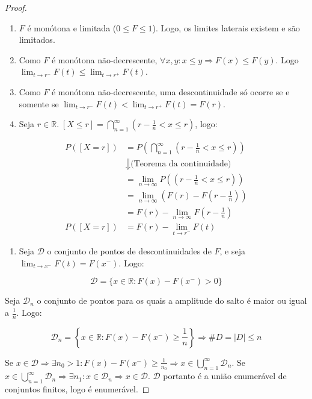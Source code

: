 \documentclass[
]{article}
\providecommand{\tightlist}{%
  \setlength{\itemsep}{0pt}\setlength{\parskip}{0pt}}
\theoremstyle{definition}
\theoremstyle{definition}
\theoremstyle{definition}
\theoremstyle{definition}
\theoremstyle{remark}
\begin{document}
\begin{proof}
\leavevmode

\begin{enumerate}
\def\labelenumi{\alph{enumi})}
\item
  \(F\) é monótona e limitada (\(0 \le F \le 1\)). Logo, os limites laterais existem e são limitados.
\item
  Como \(F\) é monótona não-decrescente, \(\forall x,y : x \le y \Rightarrow F(x) \le F(y)\). Logo \(\lim_{t \to r^{-}}F(t) \le \lim_{t \to r^{+}}F(t)\).
\item
  Como \(F\) é monótona não-decrescente, uma descontinuidade só ocorre se e somente se \(\lim_{t \to r^{-}}F(t) < \lim_{t \to r^{+}}F(t) = F(r)\).
\item
  Seja \(r \in \mathbb{R}. \; [X \le r] = \bigcap_{n=1}^{\infty}(r-\frac{1}{n} < x \le r)\), logo:
\end{enumerate}

\begin{align*}
P([X = r]) &= P\left(\bigcap_{n=1}^{\infty}\left(r-\frac{1}{n} < x \le r\right)\right) \\
&\Downarrow \text{(Teorema da continuidade)} \\
&=\lim_{n \to \infty}P\left(\left(r - \frac{1}{n} < x \le r\right)\right) \\
&= \lim_{n \to \infty} \left(F(r) - F\left(r - \frac{1}{n}\right)\right) \\
&= F(r) - \lim_{n \to \infty}F\left(r - \frac{1}{n}\right) \\
P([X = r]) &= F(r) - \lim_{t \to r^{-}}F(t)
\end{align*}

\begin{enumerate}
\def\labelenumi{\alph{enumi})}
\setcounter{enumi}{4}
\tightlist
\item
  Seja \(\mathcal{D}\) o conjunto de pontos de descontinuidades de \(F\), e seja \(\lim_{t \to x^{-}}F(t) = F(x^{-})\). Logo:
\end{enumerate}

\begin{equation*}
\mathcal{D} = \{x \in \mathbb{R} : F(x) - F(x^{-}) > 0\}
\end{equation*}

Seja \(\mathcal{D}_{n}\) o conjunto de pontos para os quais a amplitude do salto é maior ou igual a \(\frac{1}{n}\). Logo:

\begin{equation*}
\mathcal{D}_{n} = \left\{x \in \mathbb{R}: F(x) - F(x^{-}) \ge \frac{1}{n}\right\} \Rightarrow \# D = |D| \le n
\end{equation*}

Se \(x \in \mathcal{D} \Rightarrow \exists n_{0} > 1 : F(x) - F(x^{-}) \ge \frac{1}{n_{0}} \Rightarrow x \in \bigcup_{n=1}^{\infty}\mathcal{D}_{n}\). Se \(x \in \bigcup_{n=1}^{\infty}\mathcal{D}_{n} \Rightarrow \exists n_{1} : x \in \mathcal{D}_{n} \Rightarrow x \in \mathcal{D}\). \(\mathcal{D}\) portanto é a união enumerável de conjuntos finitos, logo é enumerável.

\end{proof}
\end{document}
